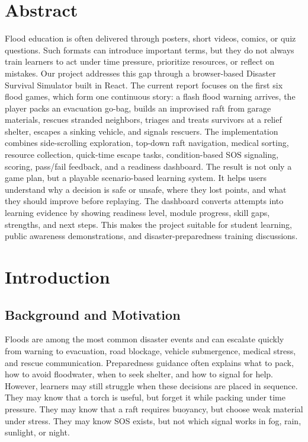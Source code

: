 \documentclass[11pt,a4paper]{article}
\newcommand{\sectionline}{\vspace{0.2em}{\color{ReportBlue}\hrule height 0.8pt}\vspace{0.6em}}
\begin{document}
\section{Abstract}
\sectionline
Flood education is often delivered through posters, short videos, comics, or quiz questions. Such formats can introduce important terms, but they do not always train learners to act under time pressure, prioritize resources, or reflect on mistakes. Our project addresses this gap through a browser-based Disaster Survival Simulator built in React. The current report focuses on the first six flood games, which form one continuous story: a flash flood warning arrives, the player packs an evacuation go-bag, builds an improvised raft from garage materials, rescues stranded neighbors, triages and treats survivors at a relief shelter, escapes a sinking vehicle, and signals rescuers. The implementation combines side-scrolling exploration, top-down raft navigation, medical sorting, resource collection, quick-time escape tasks, condition-based SOS signaling, scoring, pass/fail feedback, and a readiness dashboard. The result is not only a game plan, but a playable scenario-based learning system. It helps users understand why a decision is safe or unsafe, where they lost points, and what they should improve before replaying. The dashboard converts attempts into learning evidence by showing readiness level, module progress, skill gaps, strengths, and next steps. This makes the project suitable for student learning, public awareness demonstrations, and disaster-preparedness training discussions.

\section{Introduction}
\sectionline
\subsection{Background and Motivation}
Floods are among the most common disaster events and can escalate quickly from warning to evacuation, road blockage, vehicle submergence, medical stress, and rescue communication. Preparedness guidance often explains what to pack, how to avoid floodwater, when to seek shelter, and how to signal for help. However, learners may still struggle when these decisions are placed in sequence. They may know that a torch is useful, but forget it while packing under time pressure. They may know that a raft requires buoyancy, but choose weak material under stress. They may know SOS exists, but not which signal works in fog, rain, sunlight, or night.
\end{document}
